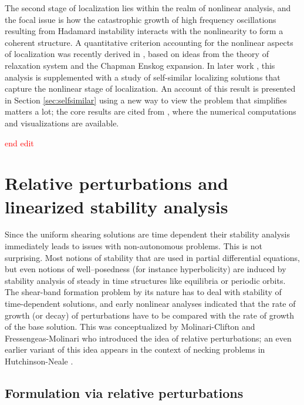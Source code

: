 \documentclass[a4paper,11pt]{article}
\newcommand{\tcr}{\textcolor{red}}
\theoremstyle{remark}
\begin{document}
The second stage of localization lies within the realm of nonlinear analysis, and the focal issue is how the catastrophic growth of high frequency oscillations resulting from Hadamard instability interacts with
the nonlinearity to form a coherent structure.
A quantitative criterion accounting for the nonlinear aspects of localization was recently derived in \cite{KT09},
based on ideas from the theory of relaxation system and the Chapman Enskog expansion. In later work
\cite{LKT17},  this analysis is supplemented with a study of self-similar localizing
solutions that capture the nonlinear stage of localization. An account of this result is presented in Section \ref{sec:selfsimilar} using a new way to view the problem that simplifies matters a lot; the core results are cited from \cite{LKT17}, where the numerical computations and visualizations are available. %


\tcr{end edit}


\vfil\eject

\section{Relative perturbations and linearized stability analysis}
\label{sec:relative}

Since the uniform shearing solutions are time dependent their stability analysis immediately leads to issues with non-autonomous problems.
This is not surprising. Most notions of stability that are used in partial differential equations, but even notions of well--posedness
(for instance hyperbolicity) are induced by stability analysis of steady in time structures like equilibria or periodic orbits.
The shear-band formation problem by its nature has to deal with stability of time-dependent solutions, and early nonlinear
analyses \cite{DH83,Tzavaras86a} indicated that the rate of growth (or decay) of perturbations have to be compared with the
rate of growth of the base solution. This was conceptualized  by Molinari-Clifton \cite{MC87} and Fressengeas-Molinari \cite{FM87} who
introduced the idea of relative perturbations; an even earlier variant of this idea appears in the context of necking
problems in Hutchinson-Neale \cite{HN77}.




\subsection{Formulation via relative perturbations}
\end{document}
